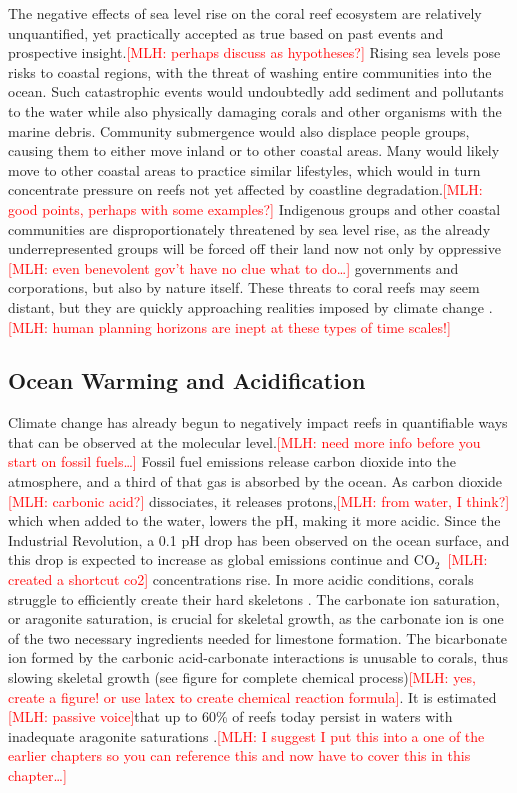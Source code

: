 \documentclass{book}\usepackage{knitr}
\newcommand{\red}[1]{\textcolor{red}{[MLH: #1]}}
\newcommand{\carbondioxide}{CO$_2$~}
\begin{document}
\begin{knitrout}
\begin{kframe}
{The negative effects of sea level rise on the coral reef ecosystem are relatively unquantified, yet practically accepted as true based on past events and prospective insight.\red{perhaps discuss as hypotheses?} Rising sea levels pose risks to coastal regions, with the threat of washing entire communities into the ocean.  Such catastrophic events would undoubtedly add sediment and pollutants to the water while also physically damaging corals and other organisms with the marine debris. Community submergence would also displace people groups, causing them to either move inland or to other coastal areas. Many would likely move to other coastal areas to practice similar lifestyles, which would in turn concentrate pressure on reefs not yet affected by coastline degradation.\red{good points, perhaps with some examples?} Indigenous groups and other coastal communities are disproportionately threatened by sea level rise, as the already underrepresented groups will be forced off their land now not only by oppressive \red{even benevolent gov't have no clue what to do\ldots} governments and corporations, but also by nature itself. These threats to coral reefs may seem distant, but they are quickly approaching realities imposed by climate change \citep{Keller2009ClimateCC}.\red{human planning horizons are inept at these types of time scales!}

\subsection{Ocean Warming and Acidification}

Climate change has already begun to negatively impact reefs in quantifiable ways that can be observed at the molecular level.\red{need more info before you start on fossil fuels\ldots} Fossil fuel emissions release carbon dioxide into the atmosphere, and a third of that gas is absorbed by the ocean\citep{Keller2009ClimateCC}. As carbon dioxide \red{carbonic acid?} dissociates, it releases protons,\red{from water, I think?} which when added to the water, lowers the pH, making it more acidic. Since the Industrial Revolution, a 0.1 pH drop has been observed on the ocean surface, and this drop is expected to increase as global emissions continue and \carbondioxide \red{created a shortcut co2} concentrations rise. In more acidic conditions, corals struggle to efficiently create their hard skeletons \citep{Keller2009ClimateCC}. The carbonate ion saturation, or aragonite saturation, is crucial for skeletal growth, as the carbonate ion is one of the two necessary ingredients needed for limestone formation. The bicarbonate ion formed by the carbonic acid-carbonate interactions is unusable to corals, thus slowing skeletal growth (see figure for complete chemical process)\red{yes, create a figure! or use latex to create chemical reaction formula}. It is estimated \red{passive voice}that up to 60\% of reefs today persist in waters with inadequate aragonite saturations \citep{Ayala_2009}.\red{I suggest I put this into a one of the earlier chapters so you can reference this and now have to cover this in this chapter\ldots}

}
\end{kframe}
\end{knitrout}
\end{document}
